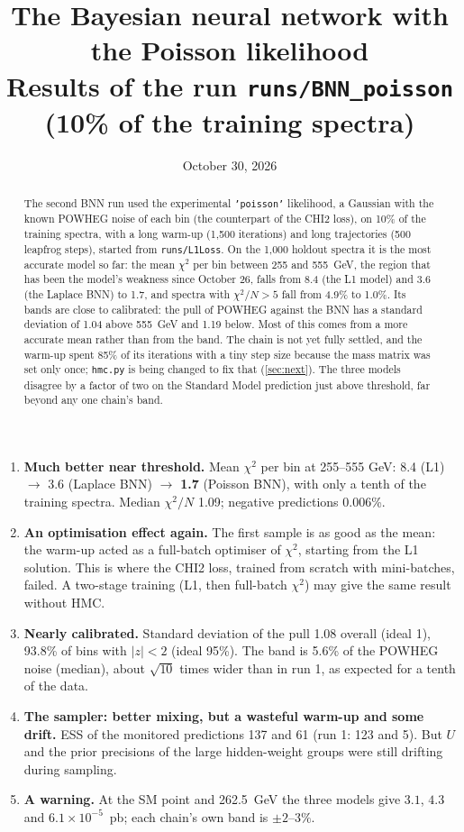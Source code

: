 \documentclass[11pt]{article}
\title{\textbf{The Bayesian neural network with the Poisson likelihood}\\[4pt]
\large Results of the run \texttt{runs/BNN\_poisson} (10\% of the training spectra)}
\date{October 30, 2026}
\newcommand{\file}[1]{\nolinkurl{#1}}
\newcommand{\code}[1]{\texttt{#1}}
\begin{document}
\maketitle

\begin{abstract}
\noindent
The second BNN run used the experimental \code{'poisson'} likelihood, a Gaussian with
the known POWHEG noise of each bin (the counterpart of the CHI2 loss), on 10\% of the
training spectra, with a long warm-up (1,500 iterations) and long trajectories (500
leapfrog steps), started from \file{runs/L1Loss}. On the 1,000 holdout spectra it is the
most accurate model so far: the mean $\chi^2$ per bin between 255 and 555~GeV, the region
that has been the model's weakness since October 26, falls from 8.4 (the L1 model) and 3.6
(the Laplace BNN) to 1.7, and spectra with $\chi^2/N > 5$ fall from 4.9\% to 1.0\%. Its
bands are close to calibrated: the pull of POWHEG against the BNN has a standard
deviation of 1.04 above 555~GeV and 1.19 below. Most of this comes from a more accurate
mean rather than from the band. The chain is not yet fully settled, and the warm-up spent
85\% of its iterations with a tiny step size because the mass matrix was set only once;
\file{hmc.py} is being changed to fix that (\cref{sec:next}). The three models disagree
by a factor of two on the Standard Model prediction just above threshold, far beyond any
one chain's band.
\end{abstract}

\begin{keyidea}
\begin{enumerate}
  \item \textbf{Much better near threshold.} Mean $\chi^2$ per bin at 255--555 GeV:
    8.4 (L1) $\to$ 3.6 (Laplace BNN) $\to$ \textbf{1.7} (Poisson BNN), with only a tenth of
    the training spectra. Median $\chi^2/N$ 1.09; negative predictions 0.006\%.
  \item \textbf{An optimisation effect again.} The first sample is as good as the mean:
    the warm-up acted as a full-batch optimiser of $\chi^2$, starting from the L1 solution.
    This is where the CHI2 loss, trained from scratch with mini-batches, failed. A
    two-stage training (L1, then full-batch $\chi^2$) may give the same result without HMC.
  \item \textbf{Nearly calibrated.} Standard deviation of the pull 1.08 overall (ideal 1),
    93.8\% of bins with $|z| < 2$ (ideal 95\%). The band is 5.6\% of the POWHEG noise
    (median), about $\sqrt{10}$ times wider than in run 1, as expected for a tenth of the
    data.
  \item \textbf{The sampler: better mixing, but a wasteful warm-up and some drift.} ESS of
    the monitored predictions 137 and 61 (run 1: 123 and 5). But $U$ and the prior
    precisions of the large hidden-weight groups were still drifting during sampling.
  \item \textbf{A warning.} At the SM point and 262.5~GeV the three models give
    $3.1$, $4.3$ and $6.1 \times 10^{-5}$~pb; each chain's own band is $\pm 2$--$3\%$.
\end{enumerate}
\end{keyidea}
\end{document}
